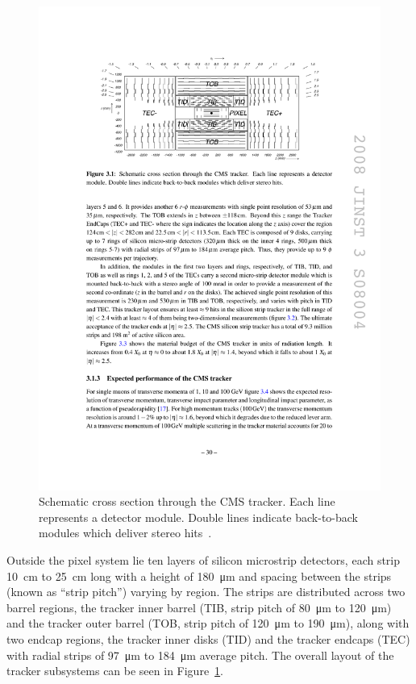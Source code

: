 \begin{figure}
  \centering
  \includegraphics[width=\textwidth]{figures/cms-tracker-xsec.pdf}
  \caption[Schematic cross section through the CMS tracker]{Schematic cross section through the CMS tracker.  Each line represents a detector module.  Double lines indicate back-to-back modules which deliver stereo hits~\cite{Evans:1129806}.}
  \label{fig:tracker-xsec}
\end{figure}

Outside the pixel system lie ten layers of silicon microstrip detectors, each strip \SI{10}{cm} to \SI{25}{cm} long with a height of \SI{180}{\micro m} and spacing between the strips (known as ``strip pitch'') varying by region.  The strips are distributed across two barrel regions, the tracker inner barrel (TIB, strip pitch of \SI{80}{\micro m} to \SI{120}{\micro m}) and the tracker outer barrel (TOB, strip pitch of \SI{120}{\micro m} to \SI{190}{\micro m}), along with two endcap regions, the tracker inner disks (TID) and the tracker endcaps (TEC) with radial strips of \SI{97}{\micro m} to \SI{184}{\micro m} average pitch.  The overall layout of the tracker subsystems can be seen in Figure~\ref{fig:tracker-xsec}.

